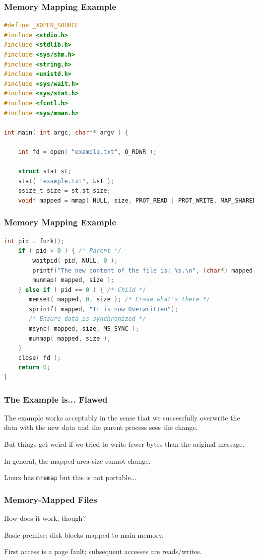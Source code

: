 \begin{frame}[fragile]
	\frametitle{Memory Mapping Example}

	\begin{lstlisting}[language=C]
#define _XOPEN_SOURCE
#include <stdio.h>
#include <stdlib.h>
#include <sys/shm.h>
#include <string.h>
#include <unistd.h>
#include <sys/wait.h>
#include <sys/stat.h>
#include <fcntl.h>
#include <sys/mman.h>

int main( int argc, char** argv ) { 

    int fd = open( "example.txt", O_RDWR );
    
    struct stat st; 
    stat( "example.txt", &st );
    ssize_t size = st.st_size;
    void* mapped = mmap( NULL, size, PROT_READ | PROT_WRITE, MAP_SHARED, fd, 0 );  
\end{lstlisting}
\end{frame}

\begin{frame}[fragile]
	\frametitle{Memory Mapping Example}

	\begin{lstlisting}[language=C]
    int pid = fork();
    if ( pid > 0 ) { /* Parent */
        waitpid( pid, NULL, 0 );
        printf("The new content of the file is: %s.\n", (char*) mapped);
        munmap( mapped, size );
    } else if ( pid == 0 ) { /* Child */
       memset( mapped, 0, size ); /* Erase what's there */
       sprintf( mapped, "It is now Overwritten");
       /* Ensure data is synchronized */
       msync( mapped, size, MS_SYNC );
       munmap( mapped, size );
    }
    close( fd );
    return 0;
}
\end{lstlisting}

\end{frame}

\begin{frame}
	\frametitle{The Example is... Flawed}

	The example works acceptably in the sense that we successfully overwrite the data with the new data and the parent process sees the change.

	But things get weird if we tried to write fewer bytes than the original message.

	In general, the mapped area size cannot change.

	Linux has \texttt{mremap} but this is not portable...

\end{frame}

\begin{frame}
\frametitle{Memory-Mapped Files}

How does it work, though?

Basic premise: disk blocks mapped to main memory.

First access is a page fault; subsequent accesses are reads/writes.

\end{frame}






